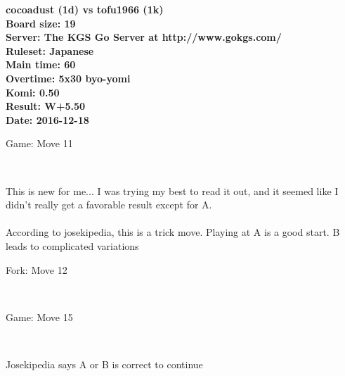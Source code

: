 \documentclass{article}
\begin{document}
\begin{titlepage}
    \null
    \vfill
    \begin{center}
        \textbf{cocoadust (1d) vs tofu1966 (1k)}\\
        \textbf{Board size: 19}\\
        \textbf{Server: The KGS Go Server at http://www.gokgs.com/}\\
        \textbf{Ruleset: Japanese}\\
        \textbf{Main time: 60}\\
        \textbf{Overtime: 5x30 byo-yomi}\\
        \textbf{Komi: 0.50}\\
        \textbf{Result: W+5.50}\\
        \textbf{Date: 2016-12-18}
    \end{center}
    \vfill
\end{titlepage}
\newpage
\tableofcontents
\newpage
\begin{section}{Game: Move 11}
\begin{center}
\cleargoban
{}
\showfullgoban
\\\parbox{4.5in}{
This is new for me... I was trying my best to read it out, and it seemed like I didn't really get a favorable result except for A.\\\\According to josekipedia, this is a trick move.  Playing at A is a good start.  B leads to complicated variations}
\end{center}
\end{section}
\begin{subsection}{Fork: Move 12}
\begin{center}
\cleargoban
{}
\showfullgoban
\\\parbox{4.5in}{
}
\end{center}
\end{subsection}
\newpage
\begin{section}{Game: Move 15}
\begin{center}
\cleargoban
{}
\showfullgoban
\\\parbox{4.5in}{
Josekipedia says A or B is correct to continue}
\end{center}
\end{section}
\end{document}
